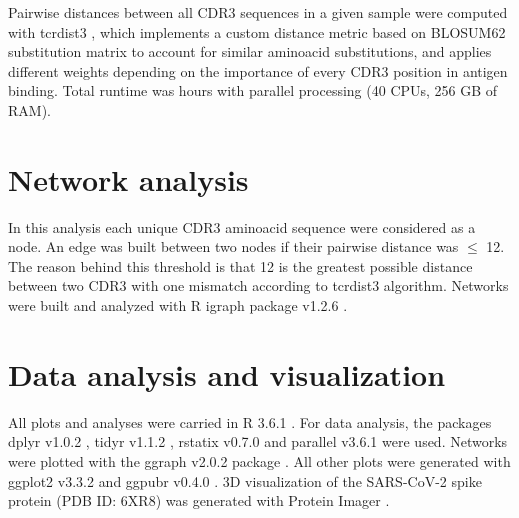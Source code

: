 Pairwise distances between all CDR3 sequences in a given sample were computed with tcrdist3 \citep{metaclonotypes, tcrdist}, which implements a custom distance metric based on BLOSUM62 substitution matrix to account for similar aminoacid substitutions, and applies different weights depending on the importance of every CDR3 position in antigen binding. Total runtime was  hours with parallel processing (40 CPUs, 256 GB of RAM).





\section*{Network analysis}

In this analysis each unique CDR3 aminoacid sequence were considered as a node. An edge was built between two nodes if their pairwise distance was $\leq$ 12. The reason behind this threshold is that 12 is the greatest possible distance between two CDR3 with one mismatch according to tcrdist3 algorithm. Networks were built and analyzed with R igraph package v1.2.6 \citep{igraph}.

\section*{Data analysis and visualization}

All plots and analyses were carried in R 3.6.1 \citep{r}. For data analysis, the packages dplyr v1.0.2 \citep{dplyr}, tidyr v1.1.2 \citep{tidyr}, rstatix v0.7.0 \citep{rstatix} and parallel v3.6.1 \citep{r} were used. Networks were plotted with the ggraph v2.0.2 package \citep{ggraph}. All other plots were generated with ggplot2 v3.3.2 \citep{ggplot2} and ggpubr v0.4.0 \citep{ggpubr}. 3D visualization of the SARS-CoV-2 spike protein (PDB ID: 6XR8) was generated with Protein Imager \citep{proteinimager}.
